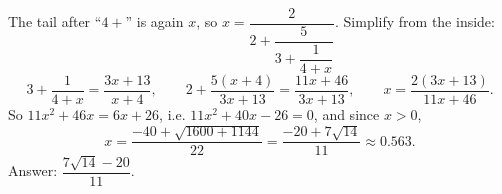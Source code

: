 The tail after ``$4+$'' is again $x$, so $x=\dfrac{2}{2+\dfrac{5}{3+\dfrac{1}{4+x}}}$. Simplify from the inside:
\[3+\dfrac{1}{4+x}=\dfrac{3x+13}{x+4},\qquad 2+\dfrac{5(x+4)}{3x+13}=\dfrac{11x+46}{3x+13},\qquad x=\dfrac{2(3x+13)}{11x+46}.\]
So $11x^2+46x=6x+26$, i.e. $11x^2+40x-26=0$, and since $x>0$,
\[x=\dfrac{-40+\sqrt{1600+1144}}{22}=\dfrac{-20+7\sqrt{14}}{11}\approx0.563.\]
Answer: $\boxed{\dfrac{7\sqrt{14}-20}{11}}$.
